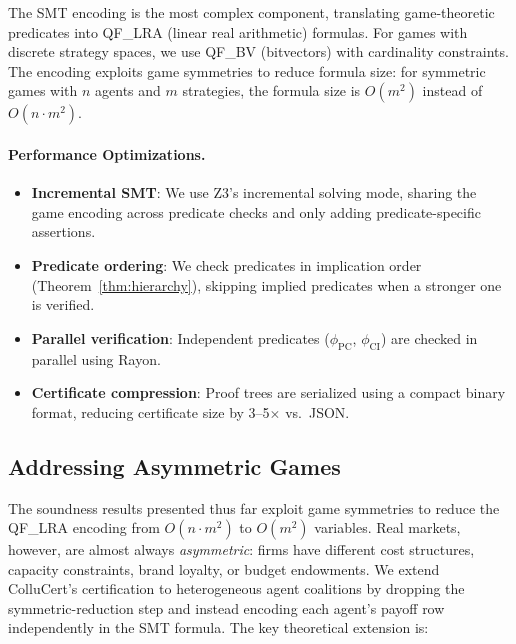 \documentclass[11pt]{article}
\begin{document}
The SMT encoding is the most complex component, translating game-theoretic predicates into QF\_LRA (linear real arithmetic) formulas. For games with discrete strategy spaces, we use QF\_BV (bitvectors) with cardinality constraints. The encoding exploits game symmetries to reduce formula size: for symmetric games with $n$ agents and $m$ strategies, the formula size is $O(m^2)$ instead of $O(n \cdot m^2)$.

\paragraph{Performance Optimizations.}
\begin{itemize}
\item \textbf{Incremental SMT}: We use Z3's incremental solving mode, sharing the game encoding across predicate checks and only adding predicate-specific assertions.
\item \textbf{Predicate ordering}: We check predicates in implication order (Theorem~\ref{thm:hierarchy}), skipping implied predicates when a stronger one is verified.
\item \textbf{Parallel verification}: Independent predicates ($\phi_{\text{PC}}$, $\phi_{\text{CI}}$) are checked in parallel using Rayon.
\item \textbf{Certificate compression}: Proof trees are serialized using a compact binary format, reducing certificate size by 3--5$\times$ vs.\ JSON.
\end{itemize}

\subsection{Addressing Asymmetric Games}
\label{sec:asymmetric}

The soundness results presented thus far exploit game symmetries to reduce the QF\_LRA encoding from $O(n \cdot m^2)$ to $O(m^2)$ variables. Real markets, however, are almost always \emph{asymmetric}: firms have different cost structures, capacity constraints, brand loyalty, or budget endowments. We extend ColluCert's certification to heterogeneous agent coalitions by dropping the symmetric-reduction step and instead encoding each agent's payoff row independently in the SMT formula. The key theoretical extension is:
\end{document}
